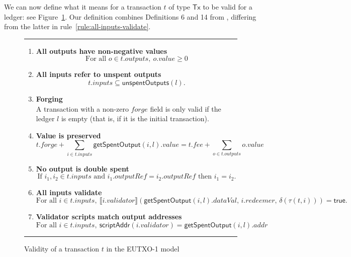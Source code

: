 \documentclass[a4paper]{article}
\newcommand{\todokwxm}[1]{\todo[inline,color=blue!20,author=kwxm]{#1}}
\newcommand{\msf}[1]{\ensuremath{\mathsf{#1}}}
\newcommand{\mi}[1]{\ensuremath{\mathit{#1}}}
\newcommand\rfskip{7pt}
\newenvironment{ruledfigure}[1]{\begin{figure}[#1]\hrule\vspace{\rfskip}}{\vspace{\rfskip}\hrule\end{figure}}
\newcommand{\true}{\textsf{true}}
\newcommand{\scriptAddr}{\msf{scriptAddr}}
\newcommand{\inputs}{\mi{inputs}}
\newcommand{\outputs}{\mi{outputs}}
\newcommand{\forge}{\mi{forge}}
\newcommand{\fee}{\mi{fee}}
\newcommand{\addr}{\mi{addr}}
\newcommand{\val}{\mi{value}}  %
\newcommand{\validator}{\mi{validator}}
\newcommand{\redeemer}{\mi{redeemer}}
\newcommand{\dataval}{\mi{dataVal}}
\newcommand{\outputref}{\mi{outputRef}}
\newcommand{\getSpent}{\msf{getSpentOutput}}
\newcommand{\unspent}{\msf{unspentOutputs}}
\newcommand{\eutxotx}{\msf{Tx}}
\begin{document}
We can now define what it means for a transaction $t$ of
type $\eutxotx$ to be valid for a ledger: see
Figure~\ref{fig:eutxo-1-validity}.  Our definition combines
Definitions 6 and 14 from \citep{Zahnentferner18-UTxO}, differing from
the latter in rule~\ref{rule:all-inputs-validate}.
\todokwxm{Check this.}

\begin{ruledfigure}{H}
\begin{enumerate}

\item
  \label{rule:all-outputs-are-non-negative}
  \textbf{All outputs have non-negative values}
  \begin{displaymath}
    \textrm{For all } o \in t.\outputs,\ o.\val \geq 0
  \end{displaymath}

\item
  \label{rule:all-inputs-refer-to-unspent-outputs}
  \textbf{All inputs refer to unspent outputs}
  \begin{displaymath}
    t.\inputs \subseteq \unspent(l).
  \end{displaymath}

\item
  \label{rule:forging}
  \textbf{Forging} \\
    A transaction with a non-zero \forge{}
    field is only valid if the ledger $l$ is empty (that
    is, if it is the initial transaction).

\item
  \label{rule:value-is-preserved}
  \textbf{Value is preserved}
  \begin{displaymath}
    t.\forge + \sum_{i \in t.\inputs} \getSpent(i, l).\val = t.\fee + \sum_{o \in t.\outputs} o.\val
  \end{displaymath}

\item
  \label{rule:no-double-spending}
  \textbf{No output is double spent}
  \begin{displaymath}
    \textrm{If } i_1, i_2 \in t.\inputs \textrm{ and }  i_1.\outputref = i_2.\outputref
    \textrm{ then } i_1 = i_2.
  \end{displaymath}

\item
  \label{rule:all-inputs-validate}
  \textbf{All inputs validate}
  \begin{displaymath}
    \textrm{For all } i \in t.\inputs,\ \llbracket
    i.\validator\rrbracket (\getSpent(i, l).\dataval,\, i.\redeemer,\,  \delta(\tau(t,i))) = \true.
  \end{displaymath}

\item
  \label{rule:validator-scripts-hash}
  \textbf{Validator scripts match output addresses}
  \begin{displaymath}
    \textrm{For all } i \in t.\inputs,\ \scriptAddr(i.\validator) = \getSpent(i, l).\addr
  \end{displaymath}

\end{enumerate}
\caption{Validity of a transaction $t$ in the EUTXO-1 model}
\label{fig:eutxo-1-validity}
\end{ruledfigure}
\end{document}
